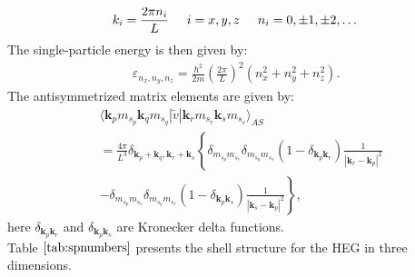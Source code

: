 \begin{equation}
k_i=\frac{2\pi n_i}{L}\hspace{0.5cm} i=x,y,z \hspace{0.5cm} n_i=0,\pm 1,\pm 2, \dots
\end{equation}
The single-particle energy is then given by:
\begin{align}
\varepsilon_{n_{x}, n_{y}, n_{z}} = \frac{\hbar^{2}}{2m}
\left( \frac{2\pi }{L}\right)^{2}
\left( n_{x}^{2} + n_{y}^{2} + n_{z}^{2}\right).
\end{align}
The antisymmetrized matrix elements are given by:
\begin{align} \tag{5}
& \langle \mathbf{k}_{p}m_{s_{p}}\mathbf{k}_{q}m_{s_{q}}
|\tilde{v}|\mathbf{k}_{r}m_{s_{r}}\mathbf{k}_{s}m_{s_{s}}\rangle_{AS} 
\nonumber \\
& = \frac{4\pi }{L^{3}}\delta_{\mathbf{k}_{p}+\mathbf{k}_{q},
	\mathbf{k}_{r}+\mathbf{k}_{s}}\left\{ 
\delta_{m_{s_{p}}m_{s_{r}}}\delta_{m_{s_{q}}m_{s_{s}}}
\left( 1 - \delta_{\mathbf{k}_{p}\mathbf{k}_{r}}\right) 
\frac{1}{|\mathbf{k}_{r}-\mathbf{k}_{p}|^{2}}
\right. \nonumber \\
& \left. - \delta_{m_{s_{p}}m_{s_{s}}}\delta_{m_{s_{q}}m_{s_{r}}}
\left( 1 - \delta_{\mathbf{k}_{p}\mathbf{k}_{s}} \right)
\frac{1}{|\mathbf{k}_{s}-\mathbf{k}_{p}|^{2}} 
\right\} ,
\end{align}
here $\delta_{\mathbf{k}_{p}\mathbf{k}_{r}}$ and $\delta_{\mathbf{k}_{p}\mathbf{k}_{s}}$ are Kronecker delta functions.\\
Table $\ref{tab:spnumbers}$ presents the shell structure for the HEG in three dimensions.


